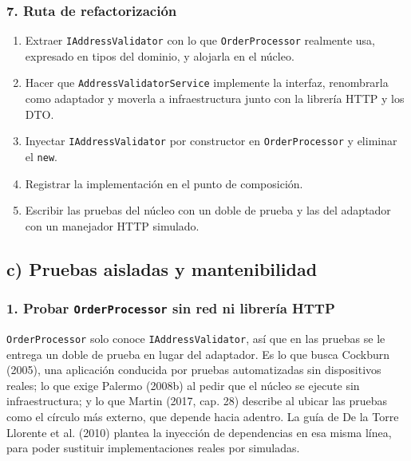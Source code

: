 \documentclass[11pt,a4paper]{article}
\begin{document}
\subsubsection*{7. Ruta de refactorización}

\begin{enumerate}[leftmargin=1.4em]
\item Extraer \texttt{IAddressValidator} con lo que \texttt{OrderProcessor} realmente usa,
expresado en tipos del dominio, y alojarla en el núcleo.
\item Hacer que \texttt{AddressValidatorService} implemente la interfaz, renombrarla como
adaptador y moverla a infraestructura junto con la librería HTTP y los DTO.
\item Inyectar \texttt{IAddressValidator} por constructor en \texttt{OrderProcessor} y eliminar
el \texttt{new}.
\item Registrar la implementación en el punto de composición.
\item Escribir las pruebas del núcleo con un doble de prueba y las del adaptador con un
manejador HTTP simulado.
\end{enumerate}

\subsection*{c) Pruebas aisladas y mantenibilidad}

\subsubsection*{1. Probar \texttt{OrderProcessor} sin red ni librería HTTP}

\texttt{OrderProcessor} solo conoce \texttt{IAddressValidator}, así que en las pruebas se le
entrega un doble de prueba en lugar del adaptador. Es lo que busca Cockburn (2005), una
aplicación conducida por pruebas automatizadas sin dispositivos reales; lo que exige Palermo
(2008b) al pedir que el núcleo se ejecute sin infraestructura; y lo que Martin (2017, cap. 28)
describe al ubicar las pruebas como el círculo más externo, que depende hacia adentro. La guía
de De la Torre Llorente et al. (2010) plantea la inyección de dependencias en esa misma línea,
para poder sustituir implementaciones reales por simuladas.
\end{document}
